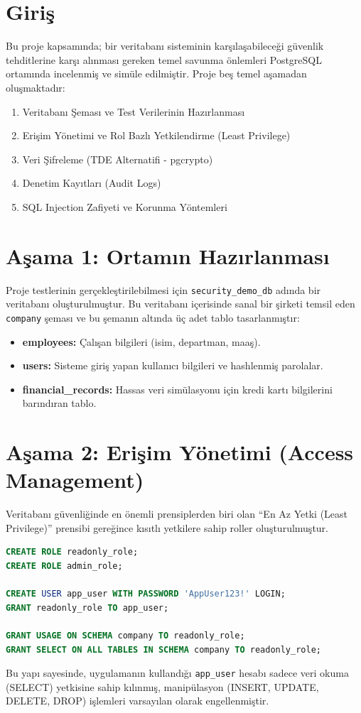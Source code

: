 \documentclass[12pt,a4paper]{article}
\begin{document}
\section{Giriş}
Bu proje kapsamında; bir veritabanı sisteminin karşılaşabileceği güvenlik tehditlerine karşı alınması gereken temel savunma önlemleri PostgreSQL ortamında incelenmiş ve simüle edilmiştir. Proje beş temel aşamadan oluşmaktadır:
\begin{enumerate}
    \item Veritabanı Şeması ve Test Verilerinin Hazırlanması
    \item Erişim Yönetimi ve Rol Bazlı Yetkilendirme (Least Privilege)
    \item Veri Şifreleme (TDE Alternatifi - pgcrypto)
    \item Denetim Kayıtları (Audit Logs)
    \item SQL Injection Zafiyeti ve Korunma Yöntemleri
\end{enumerate}

\section{Aşama 1: Ortamın Hazırlanması}
Proje testlerinin gerçekleştirilebilmesi için \texttt{security\_demo\_db} adında bir veritabanı oluşturulmuştur. Bu veritabanı içerisinde sanal bir şirketi temsil eden \texttt{company} şeması ve bu şemanın altında üç adet tablo tasarlanmıştır:
\begin{itemize}
    \item \textbf{employees:} Çalışan bilgileri (isim, departman, maaş).
    \item \textbf{users:} Sisteme giriş yapan kullanıcı bilgileri ve hashlenmiş parolalar.
    \item \textbf{financial\_records:} Hassas veri simülasyonu için kredi kartı bilgilerini barındıran tablo.
\end{itemize}

\section{Aşama 2: Erişim Yönetimi (Access Management)}
Veritabanı güvenliğinde en önemli prensiplerden biri olan ``En Az Yetki (Least Privilege)'' prensibi gereğince kısıtlı yetkilere sahip roller oluşturulmuştur.
\begin{lstlisting}[language=SQL, caption=Rol ve Kullanıcı Oluşturma]
CREATE ROLE readonly_role;
CREATE ROLE admin_role;

CREATE USER app_user WITH PASSWORD 'AppUser123!' LOGIN;
GRANT readonly_role TO app_user;

GRANT USAGE ON SCHEMA company TO readonly_role;
GRANT SELECT ON ALL TABLES IN SCHEMA company TO readonly_role;
\end{lstlisting}
Bu yapı sayesinde, uygulamanın kullandığı \texttt{app\_user} hesabı sadece veri okuma (SELECT) yetkisine sahip kılınmış, manipülasyon (INSERT, UPDATE, DELETE, DROP) işlemleri varsayılan olarak engellenmiştir.
\end{document}
